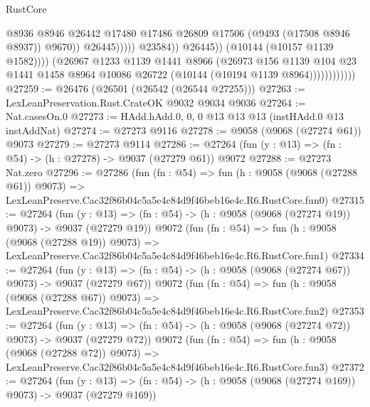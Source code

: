 \begin{lexlean}{RustCore}
\begin{coremodule}
                                              @8936
                                              @8946
                                              @26442
                                              @17480
                                              @17486
                                              @26809
                                              @17506
                                              (@9493 (@17508 @8946 @8937))
                                              @9670))
                                          @26445)))))
                                @23584))
                            @26445))
                        (@10144 (@10157 @1139 @1582))))
                    (@26967
                      @1233
                      @1139
                      @1441
                      @8966
                      (@26973
                        @156
                        @1139
                        @104
                        @23
                        @1441
                        @1458
                        @8964
                        @10086
                        @26722
                        (@10144 (@10194 @1139 @8964))))))))))))
@27259 := @26476 (@26501 (@26542 (@26544 @27255)))
@27263 := LexLeanPreservation.Rust.CrateOK @9032 @9034 @9036
@27264 := Nat.casesOn.{0}
@27273 := HAdd.hAdd.{0, 0, 0} @13 @13 @13 (instHAdd.{0} @13 instAddNat)
@27274 := @27273 @9116
@27278 := @9058 (@9068 (@27274 @61)) @9073
@27279 := @27273 @9114
@27286 := @27264 (fun (y : @13) => (fn : @54) -> (h : @27278) -> @9037 (@27279 @61)) @9072
@27288 := @27273 Nat.zero
@27296 := @27286
    (fun (fn : @54) =>
    fun (h : @9058 (@9068 (@27288 @61)) @9073) =>
    LexLeanPreserve.Cac32f86b04c5a5e4c84d9f46beb16e4c.R6.RustCore.fun0)
@27315 := @27264
    (fun (y : @13) => (fn : @54) -> (h : @9058 (@9068 (@27274 @19)) @9073) -> @9037 (@27279 @19))
    @9072
    (fun (fn : @54) =>
    fun (h : @9058 (@9068 (@27288 @19)) @9073) =>
    LexLeanPreserve.Cac32f86b04c5a5e4c84d9f46beb16e4c.R6.RustCore.fun1)
@27334 := @27264
    (fun (y : @13) => (fn : @54) -> (h : @9058 (@9068 (@27274 @67)) @9073) -> @9037 (@27279 @67))
    @9072
    (fun (fn : @54) =>
    fun (h : @9058 (@9068 (@27288 @67)) @9073) =>
    LexLeanPreserve.Cac32f86b04c5a5e4c84d9f46beb16e4c.R6.RustCore.fun2)
@27353 := @27264
    (fun (y : @13) => (fn : @54) -> (h : @9058 (@9068 (@27274 @72)) @9073) -> @9037 (@27279 @72))
    @9072
    (fun (fn : @54) =>
    fun (h : @9058 (@9068 (@27288 @72)) @9073) =>
    LexLeanPreserve.Cac32f86b04c5a5e4c84d9f46beb16e4c.R6.RustCore.fun3)
@27372 := @27264
    (fun (y : @13) => (fn : @54) -> (h : @9058 (@9068 (@27274 @169)) @9073) -> @9037 (@27279 @169))

\end{coremodule}
\end{lexlean}
